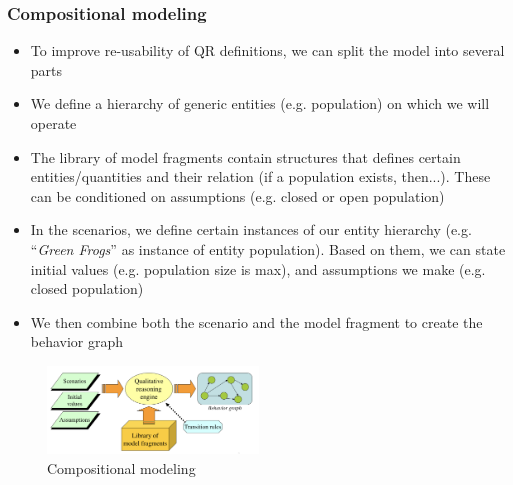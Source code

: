 \subsubsection{Compositional modeling}
\begin{itemize}
	\item To improve re-usability of QR definitions, we can split the model into several parts
	\item We define a hierarchy of generic entities (e.g. population) on which we will operate
	\item The library of model fragments contain structures that defines certain entities/quantities and their relation (if a population exists, then...). These can be conditioned on assumptions (e.g. closed or open population)
	\item In the scenarios, we define certain instances of our entity hierarchy (e.g. ``\textit{Green Frogs}'' as instance of entity population). Based on them, we can state initial values (e.g. population size is max), and assumptions we make (e.g. closed population)
	\item We then combine both the scenario and the model fragment to create the behavior graph
\end{itemize}
\begin{figure}[ht!]
	\centering
	\includegraphics[width=0.5\textwidth]{figures/kr_qr_compositional_modeling.png}
	\caption{Compositional modeling}
	\label{fig:kr_qr_compositional_modeling}
\end{figure}
